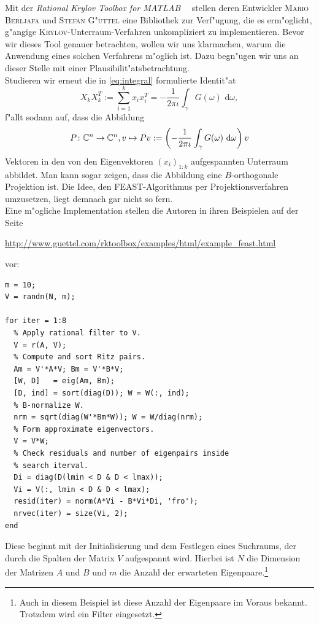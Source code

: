 Mit der \glqq\emph{Rational Krylov Toolbox for MATLAB}\grqq\ ~\cite{RKT} stellen deren Entwickler
\textsc{Mario Berljafa} und \textsc{Stefan G"uttel} eine Bibliothek zur Verf"ugung, die es erm"oglicht, g"angige \textsc{Krylov}-Unterraum-Verfahren unkompliziert zu implementieren.
Bevor wir dieses Tool genauer betrachten, wollen wir uns klarmachen, warum
die Anwendung eines solchen Verfahrens m"oglich ist.  Dazu
begn"ugen wir uns an dieser Stelle mit einer Plausibilit"atsbetrachtung.\\

Studieren wir erneut die in \eqref{eq:integral} formulierte Identit"at
\[
X_k X_k^T := \sum_{i=1}^k x_i x_i^T =
-\frac{1}{2\pi\iota}\int_\gamma G(\omega)\text{ d}\omega,
\]
f"allt sodann auf, dass die Abbildung
\[
P\colon \mathbb{C}^n\to\mathbb{C}^n,
v\mapsto Pv := \left(-\frac{1}{2\pi\iota}\int_\gamma G(\omega)\text{ d}\omega\right)v
\]
Vektoren in den von den Eigenvektoren $(x_i)_{1:k}$ aufgespannten Unterraum abbildet.
Man kann sogar zeigen, dass die Abbildung eine $B$-orthogonale Projektion ist. Die Idee, den
FEAST-Algorithmus per Projektionsverfahren umzusetzen, liegt demnach gar nicht so fern.\\

Eine m"ogliche Implementation stellen die Autoren in ihren Beispielen auf der Seite
\begin{center}
\small
\url{http://www.guettel.com/rktoolbox/examples/html/example_feast.html}
\end{center}

vor:

\begin{lstlisting}[caption=FEAST-Implementation mit Unterraumprojektion., captionpos=b]
% Search space basis V of dimension m.
m = 10;
V = randn(N, m);

for iter = 1:8
  % Apply rational filter to V.
  V = r(A, V);
  % Compute and sort Ritz pairs.
  Am = V'*A*V; Bm = V'*B*V;
  [W, D]   = eig(Am, Bm);
  [D, ind] = sort(diag(D)); W = W(:, ind);
  % B-normalize W.
  nrm = sqrt(diag(W'*Bm*W)); W = W/diag(nrm);
  % Form approximate eigenvectors.
  V = V*W;
  % Check residuals and number of eigenpairs inside
  % search iterval.
  Di = diag(D(lmin < D & D < lmax));
  Vi = V(:, lmin < D & D < lmax);
  resid(iter) = norm(A*Vi - B*Vi*Di, 'fro');
  nrvec(iter) = size(Vi, 2);
end
\end{lstlisting}

Diese beginnt mit der Initialisierung und dem Festlegen eines Suchraums, der durch die Spalten der Matrix
$V$ aufgespannt wird. Hierbei ist $N$ die Dimension der Matrizen $A$ und $B$ und $m$ die Anzahl der
erwarteten Eigenpaare.\footnote{Auch in diesem Beispiel ist diese Anzahl der Eigenpaare im Voraus bekannt.
Trotzdem wird ein Filter eingesetzt.}\\

